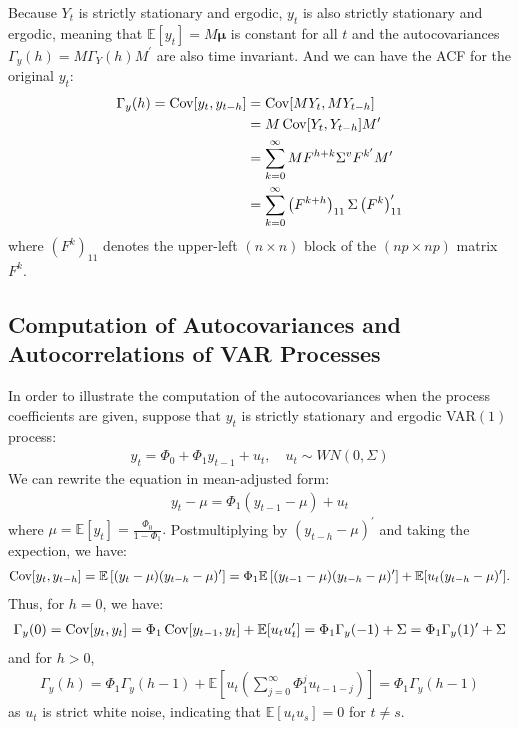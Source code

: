 Because $Y_t$ is strictly stationary and ergodic, $y_t$ is also strictly stationary and ergodic,
meaning that $\mathbb{E}[y_t] = M \mathbf{\mu}$ is constant for all $t$ and the autocovariances $\Gamma_y(h) = M \Gamma_Y(h) M^{\prime}$ are also time invariant.
And we can have the ACF for the original $y_t$:
\begin{align*}
    \Gamma_y(h) = \operatorname{Cov}[y_t, y_{t-h}] &= \operatorname{Cov}[MY_t, MY_{t-h}] \\
    &= M \operatorname{Cov}[Y_t, Y_{t-h}] M^{\prime} \\
    &= \sum_{k=0}^{\infty} M F^{h+k} \Sigma^v F^{k^{\prime}} M^{\prime} \\
    &= \sum_{k=0}^{\infty} \left(F^{k+h} \right)_{11} \Sigma \left( F^k \right)_{11}^{\prime}
\end{align*}
where $(F^k)_{11}$ denotes the upper-left $(n \times n)$ block of the $(np \times np)$ matrix $F^k$.
\subsection*{Computation of Autocovariances and Autocorrelations of VAR Processes}
In order to illustrate the computation of the autocovariances when the process
coefficients are given, suppose that $y_t$ is strictly stationary and ergodic VAR$(1)$ process:
\begin{gather*}
    y_t = \Phi_0 + \Phi_1 y_{t-1} + u_t, \quad u_t \sim WN(0, \Sigma)
\end{gather*}
We can rewrite the equation in mean-adjusted form:
\begin{gather*}
    y_t - \mu = \Phi_1 \left( y_{t-1} - \mu \right) + u_t
\end{gather*}
where $\mu = \mathbb{E}[y_t] = \frac{\Phi_0}{1-\Phi_1}.$
Postmultiplying by $(y_{t-h} - \mu)^{\prime}$ and taking the expection, we have:
\begin{gather*}
    \operatorname{Cov}[y_t ,y_{t-h}] = \mathbb{E}\left[(y_t - \mu)(y_{t-h} - \mu)^{\prime}\right] = \Phi_1 \mathbb{E}\left[(y_{t-1} - \mu)(y_{t-h} - \mu)^{\prime}\right] + \mathbb{E}[u_t (y_{t-h} - \mu)^{\prime}].
\end{gather*}
Thus, for $h=0$, we have:
\begin{gather}\label{eq:varp-gamma0}
    \Gamma_y(0) = \operatorname{Cov}[y_t, y_t] = \Phi_1 \operatorname{Cov}[y_{t-1}, y_t] + \mathbb{E}[u_t u_t^{\prime}] = \Phi_1 \Gamma_y(-1) + \Sigma = \Phi_1 \Gamma_y(1)^{\prime} + \Sigma
\end{gather}
and for $h > 0$,
\begin{gather}\label{eq:varp-gammarecursive}
    \Gamma_y(h) = \Phi_1 \Gamma_y(h-1) + \mathbb{E}\left[u_t \left(\sum_{j=0}^{\infty} \Phi_1^j u_{t-1-j}\right)\right] = \Phi_1 \Gamma_y(h-1)
\end{gather}
as $u_t$ is strict white noise, indicating that $\mathbb{E}[u_t u_s] = 0$ for $t \neq s$.

